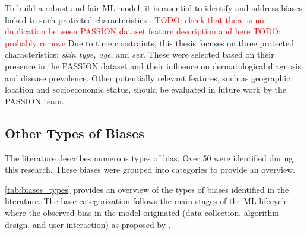 \documentclass[12pt, a4paper, oneside]{book}   	%
\renewcommand{\todo}[1]{\textcolor{red}{TODO: #1}}
\begin{document}
			
			To build a robust and fair \gls{ML} model, it is essential to identify and address biases linked to such protected characteristics \autocite{Mehrabi_2021}.
			\todo{check that there is no duplication between PASSION dataset feature description and here}
			\todo{probably remove}
			Due to time constraints, this thesis focuses on three protected characteristics: \textit{skin type, age}, and \textit{sex}. These were selected based on their presence in the PASSION dataset and their influence on dermatological diagnosis and disease prevalence. Other potentially relevant features, such as geographic location and socioeconomic status, should be evaluated in future work by the PASSION team.
			
			

			
			\subsection{Other Types of Biases}
			The literature describes numerous types of bias. Over 50 were identified during this research. These biases were grouped into categories to provide an overview.
			
			\autoref{tab:biases_types} provides an overview of the types of biases identified in the literature. The base categorization follows the main stages of the \gls{ML} lifecycle where the observed bias in the model originated (data collection, algorithm design, and user interaction) as proposed by \textcite{Mehrabi_2021}.
			
\end{document}
